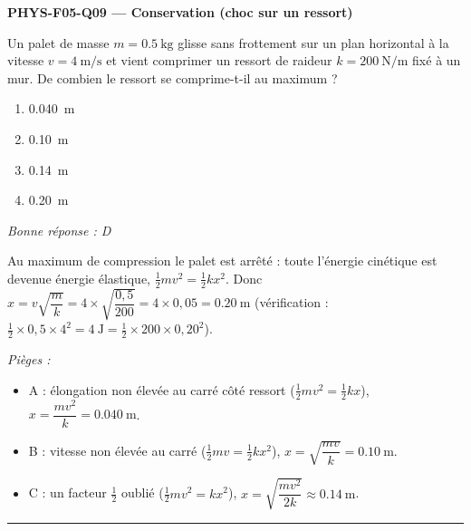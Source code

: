 \documentclass[11pt,a4paper]{article}
\newcommand{\vv}[1]{\vec{#1}}\newcommand{\ds}{\displaystyle}
\begin{document}
\noindent\textbf{PHYS-F05-Q09 --- Conservation (choc sur un ressort)}\par
Un palet de masse $m=\qty{0.5}{\kilogram}$ glisse sans frottement sur un plan horizontal à la vitesse
$v=\qty{4}{\metre\per\second}$ et vient comprimer un ressort de raideur $k=\qty{200}{\newton\per\metre}$
fixé à un mur. De combien le ressort se comprime-t-il au maximum ?
\begin{center}
\end{center}
\begin{enumerate}[label=\Alph*)]
\item \qty{0.040}{\metre}
\item \qty{0.10}{\metre}
\item \qty{0.14}{\metre}
\item \qty{0.20}{\metre}
\end{enumerate}
\textit{Bonne réponse : D}\par
Au maximum de compression le palet est arrêté : toute l'énergie cinétique est devenue énergie
élastique, $\tfrac12 m v^2=\tfrac12 k x^2$. Donc $x=v\sqrt{\dfrac{m}{k}}=4\times\sqrt{\dfrac{0{,}5}{200}}=4\times0{,}05=\qty{0.20}{\metre}$
(vérification : $\tfrac12\times0{,}5\times4^2=\qty{4}{\joule}=\tfrac12\times200\times0{,}20^2$).\par
\textit{Pièges :}
\begin{itemize}
\item A : élongation non élevée au carré côté ressort ($\tfrac12 m v^2=\tfrac12 k x$), $x=\dfrac{m v^2}{k}=\qty{0.040}{\metre}$.
\item B : vitesse non élevée au carré ($\tfrac12 m v=\tfrac12 k x^2$), $x=\sqrt{\dfrac{m v}{k}}=\qty{0.10}{\metre}$.
\item C : un facteur $\tfrac12$ oublié ($\tfrac12 m v^2=k x^2$), $x=\sqrt{\dfrac{m v^2}{2k}}\approx\qty{0.14}{\metre}$.
\end{itemize}
\vspace{8pt}\hrule\vspace{8pt}
\end{document}

